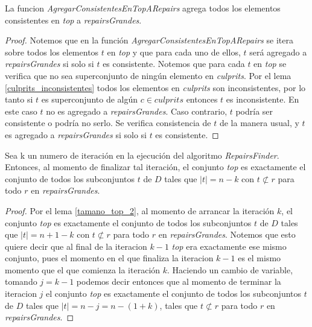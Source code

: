 \documentclass[11pt,a4paper,twoside]{tesis}
\begin{document}
\begin{lemma}\label{f_agregar_consistentes_en_top_a_repairs}
La funcion \textit{AgregarConsistentesEnTopARepairs} agrega todos los elementos consistentes en \textit{top} a \textit{repairsGrandes}.
\end{lemma}

\begin{proof}
Notemos que en la función  \textit{AgregarConsistentesEnTopARepairs} se itera sobre todos los elementos $t$ en \textit{top} y que para cada uno de ellos, $t$ será agregado a \textit{repairsGrandes} si solo si $t$ es consistente. Notemos que para cada $t$ en \textit{top} se verifica que no sea superconjunto de ningún elemento en \textit{culprits}. Por el lema  \ref{culprits_inconsistentes} todos los elementos en \textit{culprits} son inconsistentes, por lo tanto si $t$ es superconjunto de algún $c \in culprits$ entonces $t$ es inconsistente. En este caso $t$ no es agregado a \textit{repairsGrandes}. Caso contrario, $t$ podría ser consistente o podría no serlo. Se verifica consistencia de $t$ de la manera usual, y $t$ es agregado a \textit{repairsGrandes} si solo si $t$ es consistente.
\end{proof}

\begin{lemma}\label{fin_iteracion_k_top}
Sea k un numero de iteración en la ejecución del algoritmo \textit{RepairsFinder}. Entonces, al momento de finalizar tal iteración, el conjunto \textit{top} es exactamente el conjunto de todos los subconjuntos $t$ de $D$ tales que $|t|=n - k$ con $t \not\subset r$ para todo $r$ en \textit{repairsGrandes}.
\end{lemma}
\begin{proof}
Por el lema \ref{tamano_top_2}, al momento de arrancar la iteración $k$, el conjunto  \textit{top} es exactamente el conjunto de todos los subconjuntos $t$ de $D$ tales que $|t| = n + 1 - k$ con $t \not\subset r$ para todo $r$ en \textit{repairsGrandes}. Notemos que esto quiere decir que al final de la iteracion $k - 1$ \textit{top} era exactamente ese mismo conjunto, pues el momento en el que finaliza la iteracion $k - 1$ es el mismo momento que el que comienza la iteración $k$. Haciendo un cambio de variable, tomando $j = k -1$ podemos decir entonces que al momento de terminar la iteracion $j$ el conjunto \textit{top} es exactamente el conjunto de todos los subconjuntos $t$ de $D$ tales que $|t|=n - j = n - (1 + k)$, tales que $t \not\subset r$ para todo $r$ en \textit{repairsGrandes}.
\end{proof}
\end{document}
